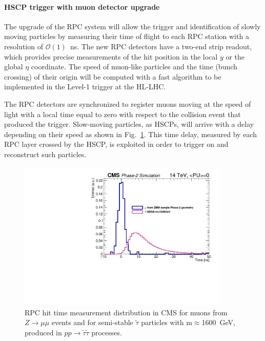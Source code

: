 \paragraph{HSCP trigger with muon detector upgrade}

The upgrade of the RPC system will allow the trigger and identification of slowly moving particles by measuring their time of flight to each RPC station with a resolution of $\mathcal{O}(1)$~ns. The new RPC detectors have a two-end strip readout, which provides precise measurements of the hit position in the local $y$ or the global $\eta$ coordinate. The speed of muon-like particles and the time (bunch crossing) of their origin will be computed with a fast algorithm to be implemented in the Level-1 trigger at the HL-LHC.

The RPC detectors are synchronized to register muons moving at the speed of light with a local time equal to zero with respect to the collision event that produced the trigger. Slow-moving particles, as HSCPs, will arrive with a delay depending on their speed as shown in Fig.~\ref{fig:hscp_time}. This time delay, measured by each RPC layer crossed by the HSCP, is exploited in order to trigger on and reconstruct such particles.

\begin{figure}[t]
\begin{center}
  \includegraphics[width=0.9\textwidth]{figures/HSCP/time.pdf}
  \caption{RPC hit time measurement distribution in CMS for muons from $Z \to \mu\mu$ events and for semi-stable $\tilde \tau$ particles with m$\approx$1600~GeV, produced in $pp \to \tilde \tau \tilde \tau$ processes.}
  \label{fig:hscp_time}
\end{center}
\end{figure}

